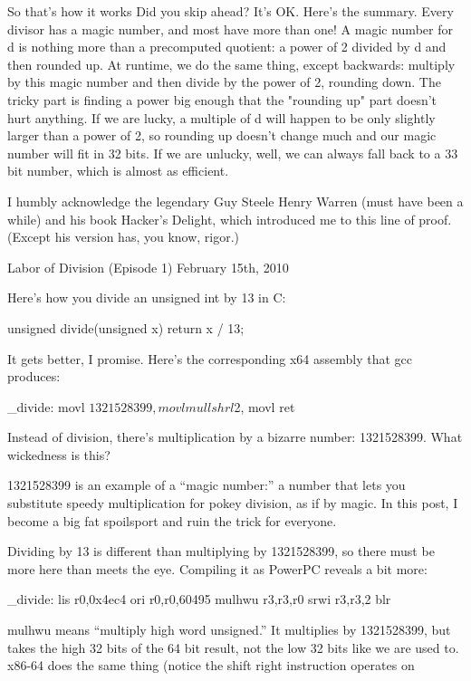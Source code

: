 So that's how it works
Did you skip ahead? It's OK. Here's the summary. Every divisor has a magic number, and most have more than one! A magic number for d is nothing more than a precomputed quotient: a power of 2 divided by d and then rounded up. At runtime, we do the same thing, except backwards: multiply by this magic number and then divide by the power of 2, rounding down. The tricky part is finding a power big enough that the "rounding up" part doesn't hurt anything. If we are lucky, a multiple of d will happen to be only slightly larger than a power of 2, so rounding up doesn't change much and our magic number will fit in 32 bits. If we are unlucky, well, we can always fall back to a 33 bit number, which is almost as efficient.

I humbly acknowledge the legendary Guy Steele Henry Warren (must have been a while) and his book Hacker's Delight, which introduced me to this line of proof. (Except his version has, you know, rigor.) 




Labor of Division (Episode 1)
February 15th, 2010

Here’s how you divide an unsigned int by 13 in C:

unsigned divide(unsigned x) { return x / 13; }

It gets better, I promise. Here’s the corresponding x64 assembly that gcc produces:

_divide:
        movl    $1321528399, %
        movl    %
        mull    %
        shrl    $2, %
        movl    %
        ret

Instead of division, there’s multiplication by a bizarre number: 1321528399. What wickedness is this?

1321528399 is an example of a “magic number:” a number that lets you substitute speedy multiplication for pokey division, as if by magic. In this post, I become a big fat spoilsport and ruin the trick for everyone.

Dividing by 13 is different than multiplying by 1321528399, so there must be more here than meets the eye. Compiling it as PowerPC reveals a bit more:

_divide:
        lis r0,0x4ec4
        ori r0,r0,60495
        mulhwu r3,r3,r0
        srwi r3,r3,2
        blr

mulhwu means “multiply high word unsigned.” It multiplies by 1321528399, but takes the high 32 bits of the 64 bit result, not the low 32 bits like we are used to. x86-64 does the same thing (notice the shift right instruction operates on %

